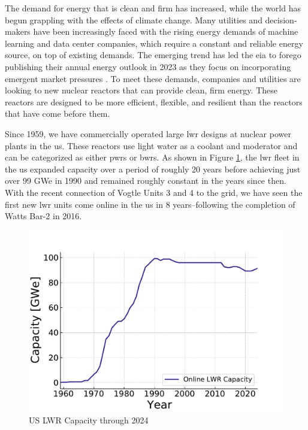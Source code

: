 The demand for energy that is clean and firm has increased, while the world has begun grappling with the effects of climate change. Many utilities and decision-makers have been increasingly faced with the rising energy demands of machine learning and data center companies, which require a constant and reliable energy source, on top of existing demands. The emerging trend has led the \gls{eia} to forego publishing their annual energy outlook in 2023 as they focus on incorporating emergent market pressures \cite{eia_annual_outlook_canceled_2023}. To meet these demands, companies and utilities are looking to new nuclear reactors that can provide clean, firm energy. These reactors are designed to be more efficient, flexible, and resilient than the reactors that have come before them.

Since 1959, we have commercially operated large \gls{lwr} designs at nuclear power plants in the \gls{us}. These reactors use light water as a coolant and moderator and can be categorized as either \gls{pwr}s or \gls{bwr}s. As shown in Figure \ref{fig:online_lwr_cap_2024}, the \gls{lwr} fleet in the \gls{us} expanded capacity over a period of roughly 20 years before achieving just over 99 GWe in 1990 and remained roughly constant in the years since then. With the recent connection of Vogtle Units 3 and 4 to the grid, we have seen the first new \gls{lwr} units come online in the \gls{us} in 8 years--following the completion of Watts Bar-2 in 2016.

\begin{figure}[htbp]
    \centering
    \includegraphics[scale=0.8]{images/intro/online_lwr_cap_2024.pdf}
    \caption{US LWR Capacity through 2024 \cite{IAEA_PRIS}}
    \label{fig:online_lwr_cap_2024}
\end{figure}

